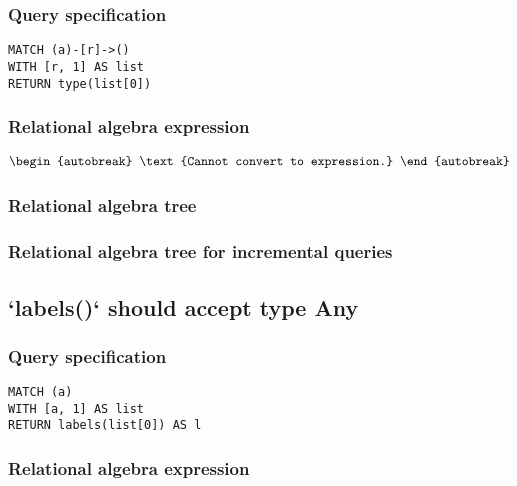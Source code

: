 \subsubsection*{Query specification}

\begin{lstlisting}
MATCH (a)-[r]->()
WITH [r, 1] AS list
RETURN type(list[0])
\end{lstlisting}

\subsubsection*{Relational algebra expression}

\begin{align*}
\begin{autobreak}
\text{Cannot convert to expression.}
\end{autobreak}
\end{align*}

\subsubsection*{Relational algebra tree}


\subsubsection*{Relational algebra tree for incremental queries}


\subsection{`labels()` should accept type Any}

\subsubsection*{Query specification}

\begin{lstlisting}
MATCH (a)
WITH [a, 1] AS list
RETURN labels(list[0]) AS l
\end{lstlisting}

\subsubsection*{Relational algebra expression}

